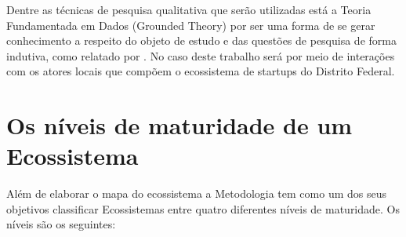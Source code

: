 Dentre as técnicas de pesquisa qualitativa que serão utilizadas está a Teoria Fundamentada em Dados (Grounded Theory) por ser uma forma de se gerar conhecimento a respeito do objeto de estudo e das questões de pesquisa de forma indutiva, como relatado por . No caso deste trabalho será por meio de interações com os atores locais que compõem o ecossistema de startups do Distrito Federal.

\section{Os níveis de maturidade de um Ecossistema}
\label{subsection:niveis_de_maturidade_de_um_ecossistema}

Além de elaborar o mapa do ecossistema a Metodologia tem como um dos seus objetivos classificar Ecossistemas entre quatro diferentes níveis de maturidade. Os níveis são os seguintes:

